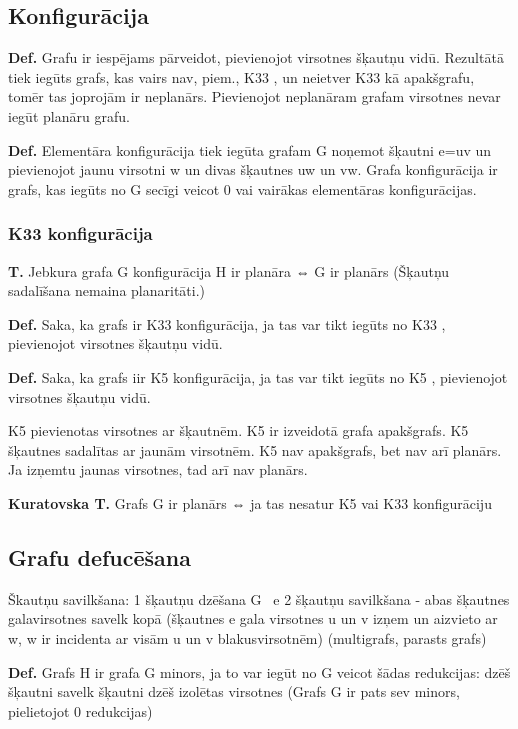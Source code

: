 \documentclass{article}
\begin{document}
\subsection{Konfigurācija}
\textbf{Def.} Grafu ir iespējams pārveidot, pievienojot virsotnes šķautņu vidū.  Rezultātā tiek iegūts grafs, kas vairs nav, piem., K33 , un neietver K33 kā apakšgrafu, tomēr tas joprojām ir neplanārs.  Pievienojot neplanāram grafam virsotnes nevar iegūt planāru grafu.

\textbf{Def.}  Elementāra konfigurācija tiek iegūta grafam G noņemot šķautni e=uv un pievienojot jaunu virsotni w un divas šķautnes uw un vw.  Grafa konfigurācija ir grafs, kas iegūts no G secīgi veicot 0 vai vairākas elementāras konfigurācijas.

\subsubsection{K33 konfigurācija}
\textbf{T.}  Jebkura grafa G konfigurācija H ir planāra ⇔ G ir planārs (Šķautņu sadalīšana nemaina planaritāti.)

\textbf{Def.}  Saka, ka grafs ir K33 konfigurācija, ja tas var tikt iegūts no K33 ,
pievienojot virsotnes šķautņu vidū.

\textbf{Def.}  Saka, ka grafs iir K5 konfigurācija, ja tas var tikt iegūts no K5 , pievienojot
virsotnes šķautņu vidū.

K5 pievienotas virsotnes ar šķautnēm. K5 ir izveidotā grafa apakšgrafs. K5 šķautnes sadalītas ar jaunām virsotnēm. K5 nav apakšgrafs, bet nav arī planārs. Ja izņemtu jaunas virsotnes, tad arī nav planārs.

\textbf{Kuratovska T.} Grafs G ir planārs ⇔ ja tas nesatur K5 vai K33 konfigurāciju

\subsection{Grafu defucēšana}

Škautņu savilkšana:
1 šķautņu dzēšana G \ e
2 šķautņu savilkšana - abas šķautnes galavirsotnes savelk kopā (šķautnes e gala virsotnes u un v izņem un aizvieto ar w, w ir incidenta ar visām u un v blakusvirsotnēm) (multigrafs, parasts grafs)

\textbf{Def.}  Grafs H ir grafa G minors, ja to var iegūt no G veicot šādas redukcijas: dzēš šķautni savelk šķautni dzēš izolētas virsotnes (Grafs G ir pats sev minors, pielietojot 0 redukcijas)
\end{document}
